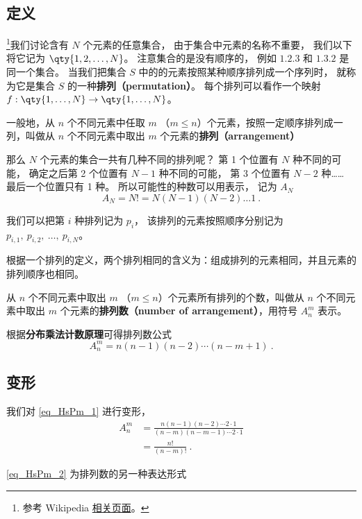 

\subsection{定义}
\footnote{参考 Wikipedia \href{https://en.wikipedia.org/wiki/Permutation}{相关页面}。}我们讨论含有 $N$ 个元素的任意集合， 由于集合中元素的名称不重要， 我们以下将它记为 $\qty{1,2,\dots, N}$。 注意集合的是没有顺序的， 例如 $\qty{1,2,3}$ 和 $\qty{1,3,2}$ 是同一个集合。 当我们把集合 $S$ 中的的元素按照某种顺序排列成一个序列时， 就称为它是集合 $S$ 的一种\textbf{排列（permutation）}。 每个排列可以看作一个映射 $f:\qty{1,\dots,N}\to\qty{1,\dots,N}$。

一般地，从 $n$ 个不同元素中任取 $m$ （$m \leq n$）个元素，按照一定顺序排列成一列，叫做从 $n$ 个不同元素中取出 $m$ 个元素的\textbf{排列（arrangement）}

那么 $N$ 个元素的集合一共有几种不同的排列呢？ 第 1 个位置有 $N$ 种不同的可能， 确定之后第 2 个位置有 $N-1$ 种不同的可能， 第 3 个位置有 $N-2$ 种…… 最后一个位置只有 1 种。 所以可能性的种数可以用表示， 记为 $A_N$
\begin{equation}
A_N = N! = N(N-1)(N-2)\dots 1~.
\end{equation}

我们可以把第 $i$ 种排列记为 $p_i$， 该排列的元素按照顺序分别记为 $p_{i,1},\ p_{i,2},\ \dots, \ p_{i,N}$。

根据一个排列的定义，两个排列相同的含义为：组成排列的元素相同，并且元素的排列顺序也相同。


从 $n$ 个不同元素中取出 $m$ （$m \leq n$）个元素所有排列的个数，叫做从 $n$ 个不同元素中取出 $m$ 个元素的\textbf{排列数（number of arrangement）}，用符号 $A_n^m$ 表示。

根据\textbf{分布乘法计数原理}可得排列数公式\begin{equation}\label{eq_HsPm_1}
A_n^m = n (n - 1)(n - 2) \cdots (n - m + 1)~.
\end{equation}

\subsection{变形}
我们对 \autoref{eq_HsPm_1} 进行变形，\begin{equation}\label{eq_HsPm_2}
\begin{aligned}
A_n^m &= \frac{n(n - 1)(n - 2) \cdots 2 \cdot 1}{(n - m)(n - m - 1) \cdots 2 \cdot 1}\\
&= \frac{n!}{(n - m)!}~.
\end{aligned}
\end{equation}

\autoref{eq_HsPm_2} 为排列数的另一种表达形式

